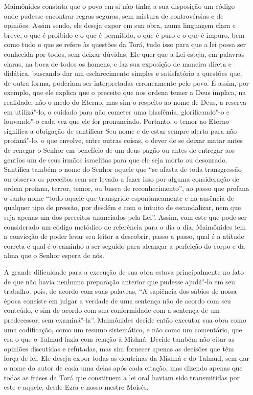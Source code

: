 Maimônides constata que o povo em si não tinha a sua disposição um
código onde pudesse encontrar regras seguras, sem mistura de
controvérsias e de opiniões. Assim sendo, ele deseja expor em sua obra,
numa linguagem clara e breve, o que é proibido e o que é permitido, o
que é puro e o que é impuro, bem como tudo o que se refere às questões
da Torá, tudo isso para que a lei possa ser conhecida por todos,
sem deixar dúvidas. Ele quer que a Lei esteja, em palavras claras, na
boca de todos os homens, e faz sua exposição de maneira direta e
didática, buscando dar um esclarecimento simples e satisfatório a
questões que, de outra forma, poderiam ser interpretadas erroneamente
pelo povo. É assim, por exemplo, que ele explica que o preceito que nos
ordena temer a Deus implica, na realidade, não o medo do Eterno, mas
sim o respeito ao nome de Deus, a reserva em utilizá"-lo, o cuidado para
não cometer uma blasfêmia, glorificando"-o e louvando"-o cada vez que ele
for pronunciado. Portanto, o temor ao Eterno significa a obrigação de
santificar Seu nome e de estar sempre alerta para não profaná"-lo, o que
envolve, entre outras coisas, o dever de se deixar matar antes de
renegar o Senhor em benefício de um deus pagão ou antes de entregar aos
gentios um de seus irmãos israelitas para que ele seja morto ou
desonrado. Santifica também o nome do Senhor aquele que ``se afasta de
toda transgressão ou observa os preceitos sem ser levado a fazer isso
por alguma consideração de ordem profana, terror, temor, ou busca de
reconhecimento'', ao passo que profana o santo nome ``todo aquele que
transgride espontaneamente e na ausência de qualquer tipo de pressão,
por desdém e com o intuito de escandalizar, nem que seja apenas um dos
preceitos anunciados pela Lei''. Assim, com este que pode ser considerado
um código metódico de referência para o dia a dia, Maimônides tem a
convicção de poder levar seu leitor a descobrir, passo a passo, qual é a
atitude correta e qual é o caminho a ser seguido para alcançar a
perfeição do corpo e da alma que o Senhor espera de nós.

A grande dificuldade para a execução de sua obra estava principalmente
no fato de que não havia nenhuma preparação anterior que pudesse
ajudá"-lo em seu trabalho, pois, de acordo com suas palavras, ``A
sapiência dos sábios de nossa época consiste em julgar a verdade de uma
sentença não de acordo com seu conteúdo, e sim de acordo com sua
conformidade com a sentença de um predecessor, sem examiná"-la''.
Maimônides decide então executar sua obra como uma codificação, como um
resumo sistemático, e não como um comentário, que era o que o
Talmud fazia com relação à Mishná. Decide também não citar
as opiniões discutidas e refutadas, mas sim fornecer apenas as decisões
que têm força de lei. Ele deseja expor todas as doutrinas da
Mishná e do Talmud, sem dar o nome do autor de cada uma
delas após cada citação, mas dizendo apenas que todas as frases da
Torá que constituem a lei oral haviam sido transmitidas por este
e aquele, desde Ezra e nosso mestre Moisés.

